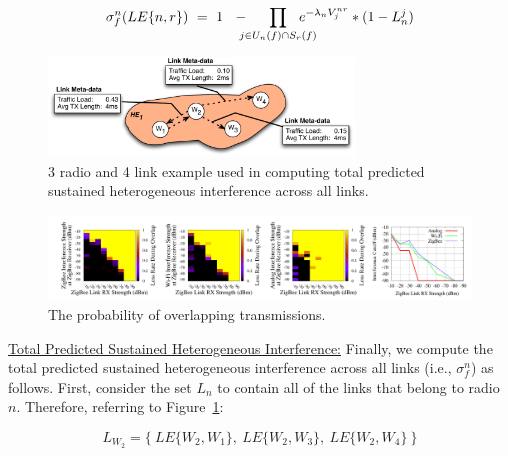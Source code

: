\vspace{-0.1in}
\begin{equation}
\label{eq:sus_single}
\sigma_f^n(LE\{n,r\}) ~= ~1~~ - \hspace{-0.1in} \prod\limits_{j \in U_n(f) \cap S_r(f)} \hspace{-0.2in}e^{- \lambda_n V^{nr}_j} * (1 - L^j_n)
\end{equation}

\begin{figure}[t]
\centering
\includegraphics[width=3.2in]{figures/multilink}
\vspace{-0.2in}
\caption{\label{fig:multilink} \small 3 radio and 4 link example used in computing total predicted sustained heterogeneous interference across all links.}
\center
\vspace{-0.1in}
\end{figure}


\begin{figure}[t]
\centering
\hspace{-0.3in}
\includegraphics[width=7.2in]{figures/together}
\vspace{-0.2in}
\caption{\label{fig:overlap} \small The probability of overlapping transmissions.}
\center
\vspace{-0.1in}
\end{figure}

\vspace{0.1in}
\noindent \uline{Total Predicted Sustained Heterogeneous Interference:} Finally, we compute the total predicted sustained heterogeneous interference across all links (i.e., $\sigma^n_f$) as follows.  First, consider the set $L_n$ to contain all of the links that belong to radio $n$. Therefore, referring to Figure~\ref{fig:multilink}:

\vspace{-0.15in}
 $$L_{W_2} = \{~LE\{W_2,W_1\},~LE\{W_2,W_3\},~LE\{W_2,W_4\}~\}$$
 
